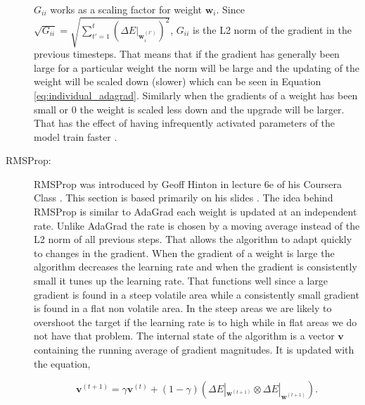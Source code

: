\begin{description}
        $G_{ii}$ works as a scaling factor for weight $\mathbf{w}_i$.
        Since $\sqrt{G_{ii}} = \sqrt{\sum_{t'=1}^t \left(\Delta
        E|_{\mathbf{w}^{(t')}_i}\right)^2}$, $G_{ii}$ is the L2 norm of the
        gradient in the previous timesteps. That means that if the gradient
        has generally been large for a particular weight the norm will be
        large and the updating of the weight will be scaled down (slower)
        which can be seen in Equation \eqref{eq:individual_adagrad}. Similarly
        when the gradients of a weight has been small or 0 the weight is
        scaled less down and the upgrade will be larger. That has the effect
        of having infrequently activated parameters of the model train faster
        \citep{Duchi:2011:ASM:1953048.2021068}.

    \item[\gls{RMSProp}:]

        \gls{RMSProp} was introduced by Geoff Hinton in lecture 6e of his
        Coursera Class \citep{DBLP:journals/corr/Ruder16}. This section is based
        primarily on his slides \citep{HintonSrivastavaSwersky2014}. The idea
        behind \gls{RMSProp} is similar to \gls{AdaGrad} each weight is updated
        at an independent rate. Unlike \gls{AdaGrad} the rate is chosen by a
        moving average instead of the L2 norm of all previous steps. That allows
        the algorithm to adapt quickly to changes in the gradient. When the
        gradient of a weight is large the algorithm decreases the learning rate
        and when the gradient is consistently small it tunes up the learning
        rate. That functions well since a large gradient is found in a steep
        volatile area while a consistently small gradient is found in a flat non
        volatile area. In the steep areas we are likely to overshoot the target
        if the learning rate is to high while in flat areas we do not have that
        problem. The internal state of the algorithm is a vector $\mathbf{v}$
        containing the running average of gradient magnitudes. It is updated
        with the equation,

        \begin{equation}
            \label{eq:rms_prop_state}
            \mathbf{v}^{(t+1)} =
                \gamma\mathbf{v}^{(t)} +
                (1 - \gamma)\left(
                    \Delta E|_{\mathbf{w}^{(t + 1)}} \otimes
                    \Delta E|_{\mathbf{w}^{(t + 1)}}
                \right).
        \end{equation}


\end{description}
